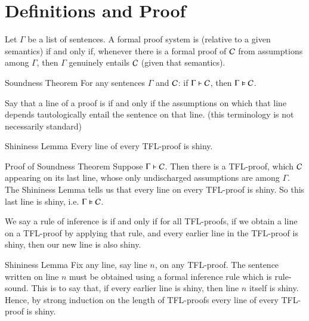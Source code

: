 \documentclass[12pt, a4paper, twoside, openright, titlepage]{book}
\begin{document}
\section{\textsection Definitions and Proof}

\begin{defn}{}{}
    Let $\Gamma$ be a list of sentences. A formal proof system is  (relative to a given semantics) if and only if, whenever there is a formal proof of $\mathcal{C}$ from assumptions among $\Gamma$, then $\Gamma$ genuinely entails $\mathcal{C}$ (given that semantics). 
\end{defn}


\begin{namthm}{Soundness Theorem}{}
    For any sentences $\Gamma$ and $\mathcal{C}$: if $\Gamma \vdash \mathcal{C}$, then $\Gamma \vDash \mathcal{C}$.
\end{namthm}

\begin{defn}{}{}
    Say that a line of a proof is  if and only if the assumptions on which that line depends tautologically entail the sentence on that line. (this terminology is not necessarily standard)
\end{defn}


\begin{lem}{Shininess Lemma}{}
    Every line of every TFL-proof is shiny.
\end{lem}



\begin{proof*}{Proof of Soundness Theorem}{}
    Suppose $\Gamma \vdash \mathcal{C}$. Then there is a TFL-proof, which $\mathcal{C}$ appearing on its last line, whose only undischarged assumptions are among $\Gamma$. The Shininess Lemma tells us that every line on every TFL-proof is shiny. So this last line is shiny, i.e. $\Gamma \vDash \mathcal{C}$.
\end{proof*}

\begin{defn}{}{}
    We say a rule of inference is  if and only if for all TFL-proofs, if we obtain a line on a TFL-proof by applying that rule, and every earlier line in the TFL-proof is shiny, then our new line is also shiny.
\end{defn}


\begin{proof*}{Shininess Lemma}{}
    Fix any line, say line $n$, on any TFL-proof. The sentence written on line $n$ must be obtained using a formal inference rule which is rule-sound. This is to say that, if every earlier line is shiny, then line $n$ itself is shiny. Hence, by strong induction on the length of TFL-proofs every line of every TFL-proof is shiny.
\end{proof*}
\end{document}
